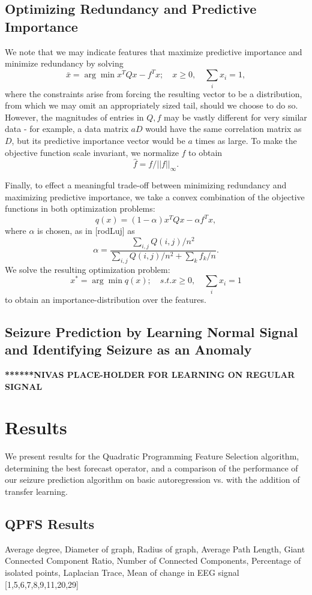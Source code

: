 \documentclass{article} %
\newcommand{\norm}[1]{\left| \left| #1 \right| \right|}
\renewcommand{\a}{\alpha}
\renewcommand{\a}{\alpha}
\begin{document}
\subsection{Optimizing Redundancy and Predictive Importance}
We note that we may indicate features that maximize predictive importance and minimize redundancy by solving 
\[ \bar{x} = \arg \min x^T Q x - f^T x; \quad x \geq 0, \quad \sum_i x_i  = 1, \]
where the constraints arise from forcing the resulting vector to be a distribution, from which we may omit an appropriately sized tail, should we choose to do so. However, the magnitudes of entries in $Q, f$ may be vastly different for very similar data - for example, a data matrix $aD$ would have the same correlation matrix as $D$, but its predictive importance vector would be $a$ times as large. To make the objective function scale invariant, we normalize $f$ to obtain
\[ \hat{f} = f/\norm{f}_{\infty}. \]

Finally, to effect a meaningful trade-off between minimizing redundancy and maximizing predictive importance, we take a convex combination of the objective functions in both optimization problems:
\[ q(x) = (1 - \a) x^T Q x - \a  f^T x, \]
where $\a$ is chosen, as in [rodLuj] as 
\[ \a  = \frac{\sum_{i, j} Q(i, j) /n^2}{\sum_{i, j} Q(i, j)/n^2 + \sum_k f_k / n}. \]
We solve the resulting optimization problem:
\[ x^* = \arg \min q(x); \quad s.t. x \geq 0, \quad \sum_i x_i = 1 \]
to obtain an importance-distribution over the features.

\subsection{Seizure Prediction by Learning Normal Signal and Identifying Seizure as an Anomaly} \label{sec:seizure_predict_method}
\textbf{******NIVAS PLACE-HOLDER FOR LEARNING ON REGULAR SIGNAL }

\section{Results} \label{sec:results}
We present results for the Quadratic Programming Feature Selection algorithm, determining the best forecast operator, and a comparison of the performance of our seizure prediction algorithm on basic autoregression vs. with the addition of transfer learning.

\subsection{QPFS Results}
Average degree, Diameter of graph, Radius of graph, Average Path Length, Giant Connected Component Ratio, Number of Connected Components, Percentage of isolated points, Laplacian Trace, Mean of change in EEG signal
[1,5,6,7,8,9,11,20,29]
\end{document}
